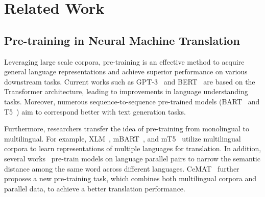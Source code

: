 \section{Related Work}
\subsection{Pre-training in Neural Machine Translation}
Leveraging large scale corpora, pre-training is an effective method to acquire general language representations and achieve superior performance on various downstream tasks. Current works such as GPT-3~\cite{DBLP:conf/nips/BrownMRSKDNSSAA20} and BERT~\cite{DBLP:conf/naacl/DevlinCLT19} are based on the Transformer architecture, leading to improvements in language understanding tasks. Moreover, numerous sequence-to-sequence pre-trained models (\eg BART~\cite{DBLP:conf/acl/LewisLGGMLSZ20} and T5~\cite{DBLP:journals/jmlr/RaffelSRLNMZLL20}) aim to correspond better with text generation tasks.

Furthermore, researchers transfer the idea of pre-training from monolingual to multilingual. For example, XLM~\cite{DBLP:conf/nips/ConneauL19}, mBART~\cite{DBLP:journals/tacl/LiuGGLEGLZ20}, and mT5~\cite{DBLP:conf/naacl/XueCRKASBR21} utilize multilingual corpora to learn representations of multiple languages for translation. In addition, several works~\cite{DBLP:conf/emnlp/ChiDMHSMHSW21,DBLP:journals/corr/abs-2106-13736,DBLP:conf/emnlp/LinPWQFZL20} pre-train models on language parallel pairs to narrow the semantic distance among the same word across different languages. CeMAT~\cite{DBLP:conf/acl/LiLZWL22} further proposes a new pre-training task, which combines both multilingual corpora and parallel data, to achieve a better translation performance.


